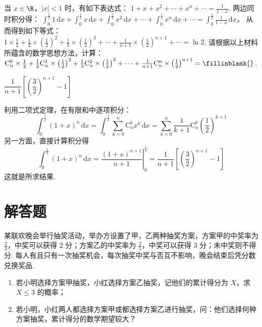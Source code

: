 \begin{problem}
当 \(x \in \R\)，\(|x| < 1\) 时，有如下表达式： \(1 + x + x^{2} + \cdots + x^{n} + \cdots = \frac{1}{1-x}\).
两边同时积分得： \(\int_{0}^{\frac{1}{2}} 1\,\text{d}x + \int_{0}^{\frac{1}{2}} x\,\text{d}x + \int_{0}^{\frac{1}{2}} x^{2}\,\text{d}x + \cdots + \int_{0}^{\frac{1}{2}} x^{n}\,\text{d}x + \cdots = \int_{0}^{\frac{1}{2}} \frac{1}{1-x}\,\text{d}x\)，
从而得到如下等式： \(1 \times \frac{1}{2} + \frac{1}{2} \times \left(\frac{1}{2}\right)^{2} + \frac{1}{3} \times \left(\frac{1}{2}\right)^{3} + \cdots + \frac{1}{n+1} \times \left(\frac{1}{2}\right)^{n+1} + \cdots = \ln 2\).
请根据以上材料所蕴含的数学思想方法，计算： \(\mathrm C_{n}^{0} \times \frac{1}{2} + \frac{1}{2} \mathrm C_{n}^{1} \times \left(\frac{1}{2}\right)^{2} + \frac{1}{3} \mathrm C_{n}^{2} \times \left(\frac{1}{2}\right)^{3} + \cdots + \frac{1}{n+1} \mathrm C_{n}^{n} \times \left(\frac{1}{2}\right)^{n+1} =\fillinblank{}\).
\end{problem}

\begin{answer}
\(\dfrac{1}{n+1}\left[\left(\dfrac{3}{2}\right)^{n+1}-1\right]\)
\end{answer}

\begin{solution}
利用二项式定理，在有限和中逐项积分：
\[
\int_0^{\frac12}(1+x)^n\,\mathrm{d}x
=\int_0^{\frac12}\sum_{k=0}^{n}\mathrm C_n^k x^k\,\mathrm{d}x
=\sum_{k=0}^{n}\frac{1}{k+1}\mathrm C_n^k\left(\frac12\right)^{k+1}
\]
另一方面，直接计算积分得
\[
\int_0^{\frac12}(1+x)^n\,\mathrm{d}x
=\left.\frac{(1+x)^{n+1}}{n+1}\right|_0^{\frac12}
=\frac{1}{n+1}\left[\left(\frac32\right)^{n+1}-1\right]
\]
这就是所求结果.
\end{solution}

\section{解答题}

\begin{problem}
某联欢晚会举行抽奖活动，举办方设置了甲，乙两种抽奖方案，方案甲的中奖率为 \(\frac{2}{3}\)，中奖可以获得 \(2\) 分；方案乙的中奖率为 \(\frac{2}{5}\)，中奖可以获得 \(3\) 分；未中奖则不得分. 每人有且只有一次抽奖机会，每次抽奖中奖与否互不影响，晚会结束后凭分数兑换奖品.

\begin{enumerate}
\item 若小明选择方案甲抽奖，小红选择方案乙抽奖，记他们的累计得分为 \(X\)，求 \(X \leqslant 3\) 的概率；
\item 若小明，小红两人都选择方案甲或都选择方案乙进行抽奖，问：他们选择何种方案抽奖，累计得分的数学期望较大？
\end{enumerate}
\end{problem}

